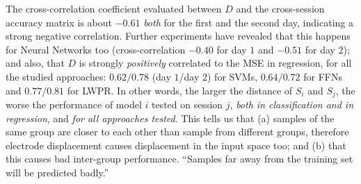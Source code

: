 The cross-correlation coefficient evaluated between $D$ and the
cross-session accuracy matrix is about $-0.61$ \emph{both} for the
first and the second day, indicating a strong negative correlation.
Further experiments have revealed that this happens for Neural
Networks too (cross-correlation $-0.40$ for day $1$ and $-0.51$ for
day $2$); and also, that $D$ is strongly \emph{positively} correlated
to the MSE in regression, for all the studied approaches: $0.62/0.78$
(day $1$/day $2$) for SVMs, $0.64/0.72$ for FFNs and $0.77/0.81$ for
LWPR. In other words, the larger the distance of $S_i$ and $S_j$, the
worse the performance of model $i$ tested on session $j$, \emph{both
in classification and in regression}, and \emph{for all approaches
tested}. This tells us that (a) samples of the same group are closer
to each other than sample from different groups, therefore electrode
displacement causes displacement in the input space too; and (b)
that this causes bad inter-group performance. ``Samples far away from
the training set will be predicted badly.''




